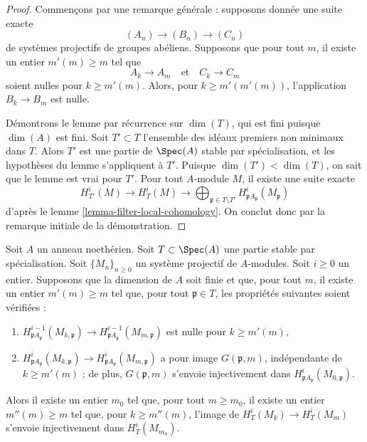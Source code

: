 \begin{proof}
Commençons par une remarque générale : supposons donnée une suite exacte
$$
(A_n) \to (B_n) \to (C_n)
$$
de systèmes projectifs de groupes abéliens. Supposons que pour tout $m$, il existe un entier $m'(m) \geq m$ tel que
$$
A_k \to A_m
\quad\text{et}\quad
C_k \to C_m
$$
soient nulles pour $k \geq m'(m)$. Alors, pour $k \geq m'(m'(m))$, l'application $B_k \to B_m$ est nulle.

\medskip\noindent
Démontrons le lemme par récurrence sur $\dim(T)$, qui est fini puisque $\dim(A)$ est fini. Soit $T' \subset T$ l'ensemble des idéaux premiers non minimaux dans $T$. Alors $T'$ est une partie de $\Spec(A)$ stable par spécialisation, et les hypothèses du lemme s'appliquent à $T'$. Puisque $\dim(T') < \dim(T)$, on sait que le lemme est vrai pour $T'$. Pour tout $A$-module $M$, il existe une suite exacte
$$
H^i_{T'}(M) \to H^i_T(M) \to
\bigoplus\nolimits_{\mathfrak p \in T \setminus T'}
H^i_{\mathfrak p A_\mathfrak p}(M_\mathfrak p)
$$
d'après le lemme \ref{lemma-filter-local-cohomology}. On conclut donc par la remarque initiale de la démonstration.
\end{proof}

\begin{lemma}
\label{lemma-essential-image}
Soit $A$ un anneau noethérien. Soit $T \subset \Spec(A)$ une partie stable par spécialisation. Soit $\{M_n\}_{n \geq 0}$ un système projectif de $A$-modules. Soit $i \geq 0$ un entier. Supposons que la dimension de $A$ soit finie et que, pour tout $m$, il existe un entier $m'(m) \geq m$ tel que, pour tout $\mathfrak p \in T$, les propriétés suivantes soient vérifiées :
\begin{enumerate}
\item $H^{i - 1}_{\mathfrak p A_\mathfrak p}(M_{k, \mathfrak p})
\to H^{i - 1}_{\mathfrak p A_\mathfrak p}(M_{m, \mathfrak p})$ est nulle pour $k \geq m'(m)$,
\item $ H^i_{\mathfrak p A_\mathfrak p}(M_{k, \mathfrak p}) \to
H^i_{\mathfrak p A_\mathfrak p}(M_{m, \mathfrak p})$ a pour image $G(\mathfrak p, m)$, indépendante de $k \geq m'(m)$ ; de plus, $G(\mathfrak p, m)$ s'envoie injectivement dans $H^i_{\mathfrak p A_\mathfrak p}(M_{0, \mathfrak p})$.
\end{enumerate}
Alors il existe un entier $m_0$ tel que, pour tout $m \geq m_0$, il existe un entier $m''(m) \geq m$ tel que, pour $k \geq m''(m)$, l'image de $H^i_T(M_k) \to H^i_T(M_m)$ s'envoie injectivement dans $H^i_T(M_{m_0})$.
\end{lemma}

